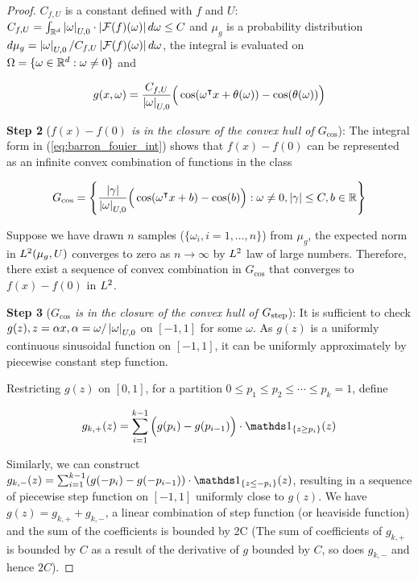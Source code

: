 \begin{proof}
    $C_{f,U}$ is a constant defined with $f$ and $U$: $C_{f,U} =
    \int_{\mathbb{R}^d} \left| \omega \right|_{U, 0} \cdot \left| \mathcal{F}(f)(\omega) \right|
    d\omega \leq C$ and $\mu_g$ is a probability distribution $d\mu_g =
    \left| \omega \right|_{U,0}/C_{f,U}\left| \mathcal{F}(f)(\omega) \right| d\omega$, the integral
    is evaluated on $\Omega = \{\omega \in \mathbb{R}^d: \omega \not = 0\}$ and

    \begin{equation}
        g(x, \omega) = \frac{C_{f,U}}{\left| \omega \right|_{U, 0}}\Big(\cos(\omega{}^{\intercal} x + \theta(\omega)) - \cos(\theta(\omega))\Big)
    \end{equation}

    \textbf{Step 2} (\textit{$f(x) - f(0)$ is in the closure of the convex hull
    of $G_{\cos}$}): The integral form in (\ref{eq:barron_fouier_int}) shows that
    $f(x) - f(0)$ can be represented as an infinite convex combination of
    functions in the class

    \begin{equation}
        G_{\cos} = \Bigg\{\frac{\left| \gamma \right|}{\left| \omega \right|_{U, 0}}\Big(\cos(\omega{}^{\intercal} x + b) - \cos(b)\Big): \omega \not= 0, \left| \gamma \right| \leq C, b \in \mathbb{R} \Bigg\}
    \end{equation}

    Suppose we have drawn $n$ samples ($\{\omega_i, i = 1,\dots, n\}$) from
    $\mu_g$, the expected norm in $L^{2}(\mu_g, U)$ converges to zero as $n \to
    \infty$ by $L^{2}$ law of large numbers. Therefore, there exist a sequence
    of convex combination in $G_{\cos}$ that converges to $f(x) - f(0)$ in
    $L^{2}$.


    \textbf{Step 3} (\textit{$G_{\cos}$ is in the closure of the convex hull of
    $G_{\textnormal{step}}$}): It is sufficient to check $g(z), z = \alpha x,
    \alpha = \omega/\left| \omega \right|_{U,0}$ on $[-1, 1]$ for some $\omega$. As
    $g(z)$ is a uniformly continuous sinusoidal function on $[-1, 1]$, it can be
    uniformly approximately by piecewise constant step function.

    Restricting $g(z)$ on $[0, 1]$, for a partition ${0 \leq p_1 \leq p_2 \leq
    \cdots \leq p_k = 1}$, define

    \begin{align}
        g_{k,+}(z) = \sum_{i=1}^{k-1} \Big(g(p_i) - g(p_{i-1})\Big) \cdot
        \indicator{\{z\geq p_i\}}(z)
    \end{align}

    Similarly, we can construct $g_{k,-}(z) = \sum_{i=1}^{k-1} (g(-p_i) -
    g(-p_{i-1})) \cdot \indicator{\{z\leq -p_i\}}(z)$, resulting in a sequence
    of piecewise step function on $[-1, 1]$ uniformly close to $g(z)$. We have
    $g(z) = g_{k,+}+g_{k,-}$, a linear combination of step function (or
    heaviside function) and the sum of the coefficients is bounded by 2C (The
    sum of coefficients of $g_{k,+}$ is bounded by $C$ as a result of the
    derivative of $g$ bounded by $C$, so does $g_{k,-}$ and hence $2C$).


\end{proof}
